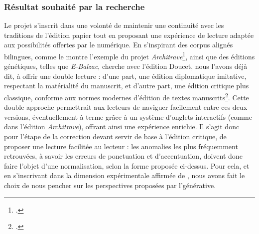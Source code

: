 \subsubsection{Résultat souhaité par la recherche}
Le projet \pense s’inscrit dans une volonté de maintenir une continuité avec les traditions de l’édition papier tout en proposant une expérience de lecture adaptée aux possibilités offertes par le numérique. En s'inspirant des corpus alignés bilingues, comme le montre l'exemple du projet \textit{Architrave}\footcite{noauthor_architrave_nodate}, ainsi que des éditions génétiques, telles que \textit{E-Balzac}, \pense cherche avec l’édition Doucet, nous l’avons déjà dit, à offrir une double lecture : d’une part, une édition diplomatique imitative, respectant la matérialité du manuscrit, et d’autre part, une édition critique plus classique, conforme aux normes modernes d’édition de textes manuscrits\footcite{carius_principes_2024}.
Cette double approche permettrait aux lecteurs de naviguer facilement entre ces deux versions, éventuellement à terme grâce à un système d’onglets interactifs (comme dans l’édition \textit{Architrave}), offrant ainsi une expérience enrichie. 
Il s’agit donc pour l’étape de la correction devant servir de base à l’édition critique, de proposer une lecture facilitée au lecteur : les anomalies les plus fréquemment retrouvées, à savoir les erreurs de ponctuation et d’accentuation, doivent donc faire l’objet d’une normalisation, selon la forme proposée ci-dessus. Pour cela, et en s’inscrivant dans la dimension expérimentale affirmée de \pense, nous avons fait le choix de nous pencher sur les perspectives proposées par l’\ia générative. 

